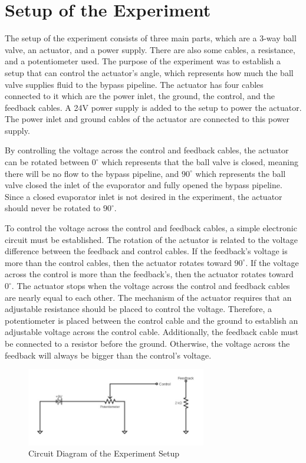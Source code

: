 \section{Setup of the Experiment}

The setup of the experiment consists of three main parts, which are a 3-way ball valve, an actuator, and a power supply. There are also some cables, a resistance, and a potentiometer used. The purpose of the experiment was to establish a setup that can control the actuator's angle, which represents how much the ball valve supplies fluid to the bypass pipeline. The actuator has four cables connected to it which are the power inlet, the ground, the control, and the feedback cables. A 24V power supply is added to the setup to power the actuator. The power inlet and ground cables of the actuator are connected to this power supply.

By controlling the voltage across the control and feedback cables, the actuator can be rotated between $0^\circ$  which represents that the ball valve is closed, meaning there will be no flow to the bypass pipeline, and $90^\circ$ which represents the ball valve closed the inlet of the evaporator and fully opened the bypass pipeline. Since a closed evaporator inlet is not desired in the experiment, the actuator should never be rotated to $90^\circ$.

To control the voltage across the control and feedback cables, a simple electronic circuit must be established. The rotation of the actuator is related to the voltage difference between the feedback and control cables. If the feedback's voltage is more than the control cables, then the actuator rotates toward $90^\circ$. If the voltage across the control is more than the feedback's, then the actuator rotates toward $0^\circ$. The actuator stops when the voltage across the control and feedback cables are nearly equal to each other. The mechanism of the actuator requires that an adjustable resistance should be placed to control the voltage. Therefore, a potentiometer is placed between the control cable and the ground to establish an adjustable voltage across the control cable. Additionally, the feedback cable must be connected to a resistor before the ground. Otherwise, the voltage across the feedback 
will always be bigger than the control's voltage.

\begin{figure}[H]
		\centering
		\includegraphics[width=0.7\textwidth]{images/devre.jpg}
		\caption[Circuit Diagram of the Experiment Setup]{Circuit Diagram of the Experiment Setup}
		\label{devre} 
\end{figure}


